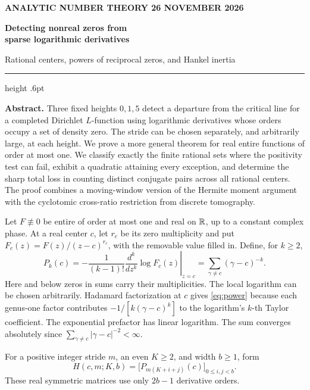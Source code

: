 \documentclass[11pt,letterpaper]{article}
\newcommand{\heading}[1]{\medskip\noindent{\large\bfseries\color{ink}#1}\par}
\begin{document}
\thispagestyle{plain}
{\small\bfseries\color{accent} ANALYTIC NUMBER THEORY \hfill 26 NOVEMBER 2026}\par
\vspace{0.16in}
{\fontsize{25}{29}\selectfont\bfseries\color{ink}Detecting nonreal zeros from\\ sparse logarithmic derivatives\par}
\vspace{4pt}
{\large Rational centers, powers of reciprocal zeros, and Hankel inertia\par}
\vspace{8pt}
\hrule height .6pt \vspace{5pt}

\textbf{Abstract.} Three fixed heights \(0,1,5\) detect a departure from the critical line for a completed Dirichlet \(L\)-function using logarithmic derivatives whose orders occupy a set of density zero. The stride can be chosen separately, and arbitrarily large, at each height. We prove a more general theorem for real entire functions of order at most one. We classify exactly the finite rational sets where the positivity test can fail, exhibit a quadratic attaining every exception, and determine the sharp total loss in counting distinct conjugate pairs across all rational centers. The proof combines a moving-window version of the Hermite moment argument with the cyclotomic cross-ratio restriction from discrete tomography.

\heading{1. What information is sampled?}
Let \(F\not\equiv0\) be entire of order at most one and real on \(\mathbb R\), up to a constant complex phase. At a real center \(c\), let \(r_c\) be its zero multiplicity and put \(F_c(z)=F(z)/(z-c)^{r_c}\), with the removable value filled in. Define, for \(k\ge2\),
\begin{equation}
 P_k(c)=-\frac{1}{(k-1)!}\left.\frac{d^k}{dz^k}\log F_c(z)\right|_{z=c}
       =\sum_{\gamma\ne c}(\gamma-c)^{-k}.                 \label{eq:power}
\end{equation}
Here and below zeros in sums carry their multiplicities. The local logarithm can be chosen arbitrarily. Hadamard factorization at \(c\) gives \eqref{eq:power} because each genus-one factor contributes \(-1/[k(\gamma-c)^k]\) to the logarithm's \(k\)-th Taylor coefficient. The exponential prefactor has linear logarithm. The sum converges absolutely since \(\sum_{\gamma\ne c}|\gamma-c|^{-2}<\infty\).

For a positive integer stride \(m\), an even \(K\ge2\), and width \(b\ge1\), form
\begin{equation}
 H(c,m;K,b)=\big[P_{m(K+i+j)}(c)\big]_{0\le i,j<b}.
 \label{eq:H}
\end{equation}
These real symmetric matrices use only \(2b-1\) derivative orders.
\end{document}
